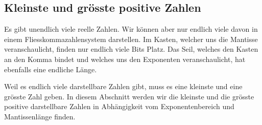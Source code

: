 \subsection{Kleinste und grösste positive Zahlen}\label{sec:groesste-kleinste}

Es gibt unendlich viele reelle Zahlen. Wir können aber nur endlich viele davon in einem Fliesskommazahlensystem darstellen. Im Kasten, welcher uns die Mantisse veranschaulicht, finden nur endlich viele Bits Platz. Das Seil, welches den Kasten an den Komma bindet und welches uns den Exponenten veranschaulicht, hat ebenfalls eine endliche Länge.

Weil es endlich viele darstellbare Zahlen gibt, muss es eine kleinste und eine grösste Zahl geben. In diesem Abschnitt werden wir die kleinste und die grösste positive darstellbare Zahlen in Abhängigkeit vom Exponentenbereich und Mantissenlänge finden.


